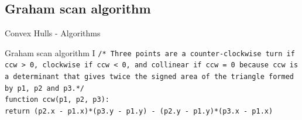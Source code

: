 \documentclass{beamer}
\begin{document}
\subsection{Graham scan algorithm}
\begin{frame}{Convex Hulls - Algorithms}
\begin{block}{Graham scan algorithm I}
\fontsize{6pt}{7.2}\selectfont
\texttt{/* Three points are a counter-clockwise turn if ccw > 0, clockwise if ccw < 0, and collinear if ccw = 0 because ccw is a determinant that gives twice the signed  area of the triangle formed by p1, p2 and p3.*/ \\
function ccw(p1, p2, p3): \\
    \hspace*{1cm}return (p2.x - p1.x)*(p3.y - p1.y) - (p2.y - p1.y)*(p3.x - p1.x) \\ }
\end{block}
\end{frame}
\end{document}
